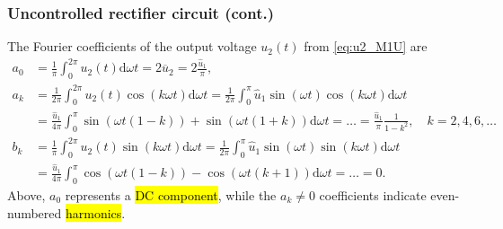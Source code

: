 \begin{frame}
    \frametitle{Uncontrolled rectifier circuit (cont.)}
    The Fourier coefficients of the output voltage $u_2(t)$ from \eqref{eq:u2_M1U} are
    \begin{equation}
        \begin{split}
            a_0 &= \frac{1}{\pi} \int_{0}^{2\pi} u_2(t) \mathrm{d} \omega t = 2 \overline{u}_2= 2 \frac{\hat{u}_1}{\pi},\\
            a_k &= \frac{1}{2\pi} \int_{0}^{2\pi} u_2(t) \cos(k\omega t) \mathrm{d}\omega t = \frac{1}{2\pi} \int_{0}^{\pi} \hat{u}_1 \sin(\omega t) \cos(k\omega t) \mathrm{d}\omega t\\  &= \frac{\hat{u}_1}{4\pi} \int_{0}^{\pi}  \sin(\omega t(1-k)) + \sin(\omega t(1+k)) \mathrm{d}\omega t = \ldots =  \frac{\hat{u}_1}{\pi}\frac{1}{1-k^2}, \quad k=2,4,6,\ldots\\
            b_k &= \frac{1}{\pi} \int_{0}^{2\pi} u_2(t) \sin(k\omega t) \mathrm{d}\omega t = \frac{1}{2\pi} \int_{0}^{\pi} \hat{u}_1 \sin(\omega t) \sin(k\omega t) \mathrm{d}\omega t \\ &=\frac{\hat{u}_1}{4\pi} \int_{0}^{\pi}  \cos(\omega t(1-k)) - \cos(\omega t(k+1)) \mathrm{d}\omega t = \ldots = 0.
        \end{split}
        \label{eq:u2_M1U_Fourier}
    \end{equation}
    Above, $a_0$ represents a \hl{DC component}, while the $a_k \neq 0$ coefficients indicate even-numbered \hl{harmonics}.
\end{frame}

